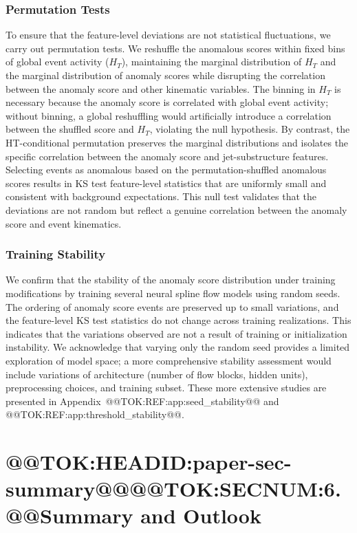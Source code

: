 \documentclass[11pt]{article}
\begin{document}
\subsubsection{Permutation Tests}

To ensure that the feature-level deviations are not statistical fluctuations, we carry out permutation tests. We reshuffle the anomalous scores within fixed bins of global event activity ($H_T$), maintaining the marginal distribution of $H_T$ and the marginal distribution of anomaly scores while disrupting the correlation between the anomaly score and other kinematic variables. The binning in $H_T$ is necessary because the anomaly score is correlated with global event activity; without binning, a global reshuffling would artificially introduce a correlation between the shuffled score and $H_T$, violating the null hypothesis. By contrast, the HT-conditional permutation preserves the marginal distributions and isolates the specific correlation between the anomaly score and jet-substructure features. Selecting events as anomalous based on the permutation-shuffled anomalous scores results in KS test feature-level statistics that are uniformly small and consistent with background expectations. This null test validates that the deviations are not random but reflect a genuine correlation between the anomaly score and event kinematics.

\subsubsection{Training Stability}

We confirm that the stability of the anomaly score distribution under training modifications by training several neural spline flow models using random seeds. The ordering of anomaly score events are preserved up to small variations, and the feature-level KS test statistics do not change across training realizations. This indicates that the variations observed are not a result of training or initialization instability. We acknowledge that varying only the random seed provides a limited exploration of model space; a more comprehensive stability assessment would include variations of architecture (number of flow blocks, hidden units), preprocessing choices, and training subset. These more extensive studies are presented in Appendix~@@TOK:REF:app:seed_stability@@ and @@TOK:REF:app:threshold_stability@@.

\section{@@TOK:HEADID:paper-sec-summary@@@@TOK:SECNUM:6. @@Summary and Outlook}
\end{document}
